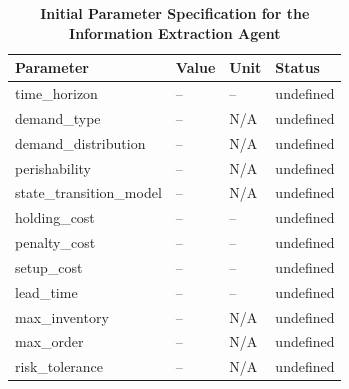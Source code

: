 \documentclass[mnsc,nonblindrev]{informs3_hide}
\begin{document}
    
    \begin{table}[!ht]
        \centering
        \renewcommand{\arraystretch}{1.1}
        \begin{tabular}{P V U T}
            \toprule
            \textbf{Parameter} & \textbf{Value} & \textbf{Unit} & \textbf{Status} \\
            \midrule
            time\_horizon            & -- & --  & undefined \\
            demand\_type             & -- & N/A & undefined \\
            demand\_distribution     & -- & N/A & undefined \\
            perishability            & -- & N/A & undefined \\
            state\_transition\_model & -- & N/A & undefined \\
            holding\_cost            & -- & --  & undefined \\
            penalty\_cost            & -- & --  & undefined \\
            setup\_cost              & -- & --  & undefined \\
            lead\_time               & -- & --  & undefined \\
            max\_inventory           & -- & N/A & undefined \\
            max\_order               & -- & N/A & undefined \\
            risk\_tolerance          & -- & N/A & undefined \\
            \bottomrule
        \end{tabular}
        \caption{\textbf{Initial Parameter Specification for the Information Extraction Agent}}
        \vspace{1.2em}
        \label{tab:initial_params}
        

\end{table}
\end{document}
